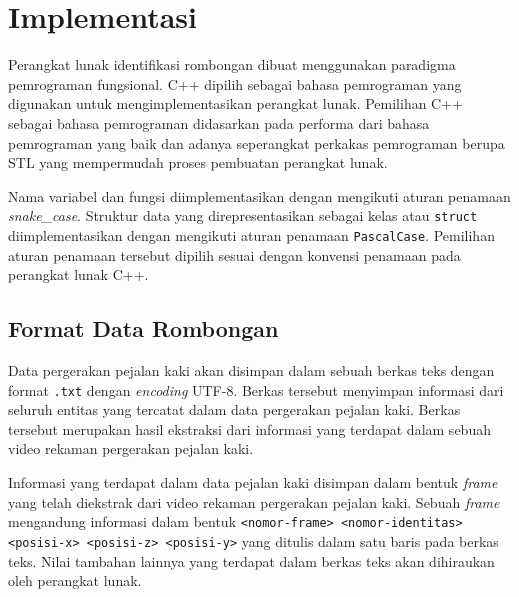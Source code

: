 \chapter{Implementasi}
\label{chap:implementasi}

\iffalse

Setelah rancangan perangkat lunak berhasil dibuat, tahap selanjutnya yang akan dikerjakan adalah tahap implementasi perangkat lunak. Dalam tahap implementasi perangkat lunak, rancangan perangkat lunak yang sudah dibuat akan diubah menjadi kode program yang sesuai dengan rancangan dan tujuan perangkat lunak.

\fi

Perangkat lunak identifikasi rombongan dibuat menggunakan paradigma pemrograman fungsional. C++ dipilih sebagai bahasa pemrograman yang digunakan untuk mengimplementasikan perangkat lunak. Pemilihan C++ sebagai bahasa pemrograman didasarkan pada performa dari bahasa pemrograman yang baik dan adanya seperangkat perkakas pemrograman berupa STL yang mempermudah proses pembuatan perangkat lunak.

Nama variabel dan fungsi diimplementasikan dengan mengikuti aturan penamaan \textit{snake\_case}. Struktur data yang direpresentasikan sebagai kelas atau \texttt{struct} diimplementasikan dengan mengikuti aturan penamaan \texttt{PascalCase}. Pemilihan aturan penamaan tersebut dipilih sesuai dengan konvensi penamaan pada perangkat lunak C++.

\section{Format Data Rombongan}
\label{sec:input-structure}

Data pergerakan pejalan kaki akan disimpan dalam sebuah berkas teks dengan format \texttt{.txt} dengan \textit{encoding} UTF-8. Berkas tersebut menyimpan informasi dari seluruh entitas yang tercatat dalam data pergerakan pejalan kaki. Berkas tersebut merupakan hasil ekstraksi dari informasi yang terdapat dalam sebuah video rekaman pergerakan pejalan kaki.

Informasi yang terdapat dalam data pejalan kaki disimpan dalam bentuk \textit{frame} yang telah diekstrak dari video rekaman pergerakan pejalan kaki. Sebuah \textit{frame} mengandung informasi dalam bentuk \texttt{<nomor-frame> <nomor-identitas> <posisi-x> <posisi-z> <posisi-y>} yang ditulis dalam satu baris pada berkas teks. Nilai tambahan lainnya yang terdapat dalam berkas teks akan dihiraukan oleh perangkat lunak.

